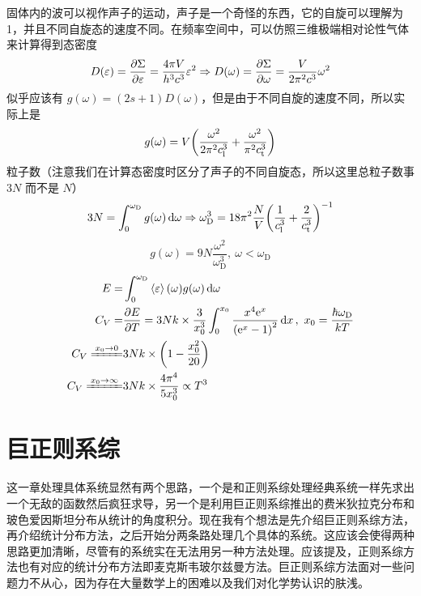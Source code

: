 固体内的波可以视作声子的运动，声子是一个奇怪的东西，它的自旋可以理解为 1，并且不同自旋态的速度不同。在频率空间中，可以仿照三维极端相对论性气体来计算得到态密度 \[
    D(\varepsilon) = \pdv{\Sigma}{\varepsilon} = \frac{4 \pi V}{h^3 c^3} \varepsilon^2 \Rightarrow D(\omega) = \pdv{\Sigma}{\omega} = \frac{V}{2 \pi^2 c^3} \omega^2
\] 似乎应该有 $g(\omega) = (2 s + 1) D(\omega)$，但是由于不同自旋的速度不同，所以实际上是 \[
    g(\omega) = V \qty(\frac{\omega^2}{2 \pi^2 c_{\text{l}}^3} + \frac{\omega^2}{\pi^2 c_{\text{t}}^3})
\]
粒子数（注意我们在计算态密度时区分了声子的不同自旋态，所以这里总粒子数事 $3 N$ 而不是 $N$） \[
    3 N = \int_0^{\omega_{\text{D}}} g(\omega) \dd{\omega} \Rightarrow \omega_{\text{D}}^3 = 18 \pi^2 \frac{N}{V} \qty(\frac{1}{c_{\text{l}}^3} + \frac{2}{c_{\text{t}}^3})^{- 1}\] \[g(\omega) = 9 N \frac{\omega^2}{\omega_{\text{D}}^3},\ \omega < \omega_{\text{D}}
\] \begin{align*}
    E =                             & \int_0^{\omega_{\text{D}}} \expval{\varepsilon} (\omega) g(\omega) \dd{\omega}                                                                                  \\
    C_V =                           & \pdv{E}{T} = 3 N k \times \frac{3}{x_0^3} \int_0^{x_0} \frac{x^4 \mathrm{e}^{x}}{\qty(\mathrm{e}^{x} - 1)^2} \dd{x},\ x_0 = \frac{\hbar \omega_{\text{D}}}{k T} \\
    C_V \xlongequal{x_0 \to 0}      & 3 N k \times \qty(1 - \frac{x_0^2}{20})                                                                                                                         \\
    C_V \xlongequal{x_0 \to \infty} & 3 N k \times \frac{4 \pi^4}{5 x_0^3} \propto T^3
\end{align*}

\section{巨正则系综}

这一章处理具体系统显然有两个思路，一个是和正则系综处理经典系统一样先求出一个无敌的函数然后疯狂求导，另一个是利用巨正则系综推出的费米狄拉克分布和玻色爱因斯坦分布从统计的角度积分。现在我有个想法是先介绍巨正则系综方法，再介绍统计分布方法，之后开始分两条路处理几个具体的系统。这应该会使得两种思路更加清晰，尽管有的系统实在无法用另一种方法处理。应该提及，正则系综方法也有对应的统计分布方法即麦克斯韦玻尔兹曼方法。巨正则系综方法面对一些问题力不从心，因为存在大量数学上的困难以及我们对化学势认识的肤浅。

